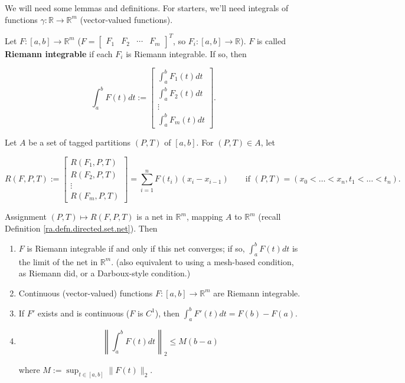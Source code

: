 We will need some lemmas and definitions. For starters, we'll need integrals of functions \(\gamma: \mathbb{R} \to \mathbb{R}^m\) (vector-valued functions). 

\begin{definition}

Let \(F: [a,b] \to \mathbb{R}^m\) (\(F = \begin{bmatrix} F_1 & F_2 & \cdots & F_m \end{bmatrix}^T\), so \(F_i : [a,b] \to \mathbb{R}\)). \(F\) is called \textbf{Riemann integrable} if each \(F_i\) is Riemann integrable. If so, then

\[
\int_a^b F(t) dt := \begin{bmatrix} \int_a^bF_1(t) dt \\  \int_a^bF_2(t) dt \\ \vdots \\  \int_a^bF_m (t) dt \end{bmatrix}.
\]

\end{definition}

\begin{proposition}\label{ra.lemma.picard.1}

Let \(A\) be a set of tagged partitions \((P,T)\) of \([a,b]\). For \((P,T) \in A\), let 

\[
R(F, P, T) := \begin{bmatrix} R(F_1, P, T) \\ R(F_2 , P, T) \\ \vdots \\ R(F_m, P, T) \end{bmatrix} =  \sum_{i=1}^n F(t_i) (x_i -x_{i-1}) \qquad \text{if } (P,T) = (x_0 < \ldots < x_n, t_1 < \ldots < t_n).
\]

Assignment \((P,T) \mapsto R(F, P, T)\) is a net in \(\mathbb{R}^m\), mapping \(A\) to \(\mathbb{R}^m\) (recall Definition \ref{ra.defn.directed.set.net}). Then

\begin{enumerate}

\item \(F\) is Riemann integrable if and only if this net converges; if so, \(\int_a^b F(t) dt\) is the limit of the net in \(\mathbb{R}^m\). (also equivalent to using a mesh-based condition, as Riemann did, or a Darboux-style condition.)

\item Continuous (vector-valued) functions \(F: [a,b] \to \mathbb{R}^m\) are Riemann integrable.

\item If \(F'\) exists and is continuous (\(F\) is \(C^1\)), then \(\int_a^b F'(t) dt = F(b) - F(a)\). 

\item 

\[
\left\lVert \int_a^b F(t) dt \right\rVert_2 \leq M(b-a)
\]

where \(M := \sup_{t \in [a,b]} \lVert F(t) \rVert_2\).

\end{enumerate}

\end{proposition}

